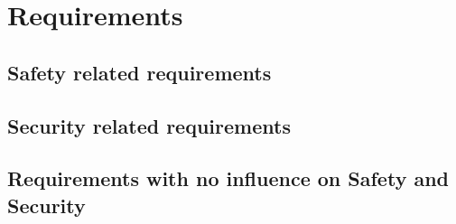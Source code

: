 \section{Requirements}
\label{chapter4}


\subsection{Safety related requirements}





\subsection{Security related requirements}


\subsection{Requirements with no influence on Safety and Security}
